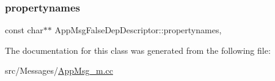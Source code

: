 \subsubsection{\texorpdfstring{propertynames}{propertynames}}
{\footnotesize\ttfamily const char$\ast$$\ast$ App\+Msg\+False\+Dep\+Descriptor\+::propertynames\hspace{0.3cm}{\ttfamily [mutable]}, {\ttfamily [private]}}



The documentation for this class was generated from the following file\+:\begin{DoxyCompactItemize}
\item 
src/\+Messages/\hyperlink{AppMsg__m_8cc}{App\+Msg\+\_\+m.\+cc}\end{DoxyCompactItemize}
